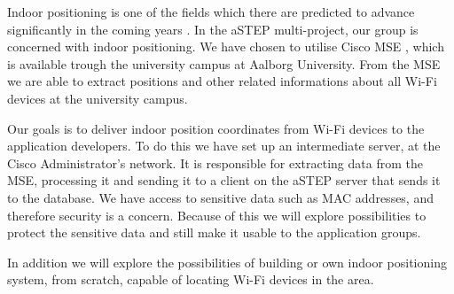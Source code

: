 Indoor positioning is one of the fields which there are predicted to advance significantly in the coming years \cite{DonDIndoorIsNext}. In the aSTEP multi-project, our group is concerned with indoor positioning. We have chosen to utilise Cisco MSE \cite{ciscoMSE}, which is available trough the university campus at Aalborg University. From the MSE we are able to extract positions and other related informations about all Wi-Fi devices at the university campus.

Our goals is to deliver indoor position coordinates from Wi-Fi devices to the application developers. To do this we have set up an intermediate server, at the Cisco Administrator's network. It is responsible for extracting data from the MSE, processing it and sending it to a client on the aSTEP server that sends it to the database. We have access to sensitive data such as MAC addresses, and therefore security is a concern. Because of this we will explore possibilities to protect the sensitive data and still make it usable to the application groups.

In addition we will explore the possibilities of building or own indoor positioning system, from scratch, capable of locating Wi-Fi devices in the area.
